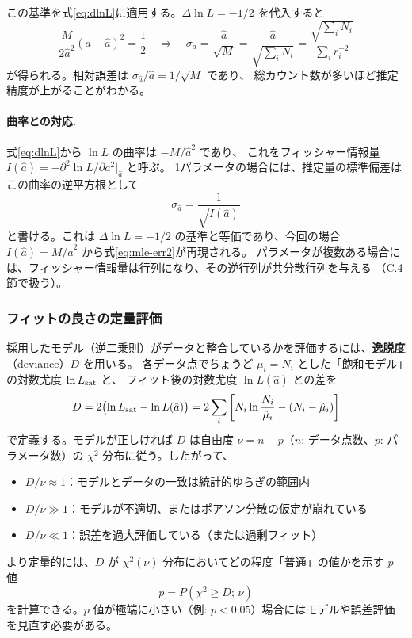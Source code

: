 \documentclass[uplatex,dvipdfmx,12pt,nomag]{jsarticle}
\begin{document}
この基準を式\eqref{eq:dlnL}に適用する。$\Delta\ln L = -1/2$ を代入すると
\begin{equation}
  \frac{M}{2\hat{a}^2}(a - \hat{a})^2 = \frac{1}{2}
  \quad\Longrightarrow\quad
  \sigma_{\hat{a}}
  = \frac{\hat{a}}{\sqrt{M}}
  = \frac{\hat{a}}{\sqrt{\sum_i N_i}}
  = \frac{\sqrt{\sum_i N_i}}{\sum_i r_i^{-2}}
  \label{eq:mle-err2}
\end{equation}
が得られる。相対誤差は $\sigma_{\hat{a}}/\hat{a} = 1/\sqrt{M}$ であり、
総カウント数が多いほど推定精度が上がることがわかる。

\paragraph{曲率との対応.}
式\eqref{eq:dlnL}から $\ln L$ の曲率は $-M/\hat{a}^2$ であり、
これをフィッシャー情報量 $I(\hat{a}) = -\partial^2\ln L/\partial a^2\big|_{\hat{a}}$ と呼ぶ。
1パラメータの場合には、推定量の標準偏差はこの曲率の逆平方根として
\begin{equation}
  \sigma_{\hat{a}} = \frac{1}{\sqrt{I(\hat{a})}}
  \label{eq:mle-err}
\end{equation}
と書ける。これは $\Delta\ln L = -1/2$ の基準と等価であり、今回の場合 $I(\hat{a}) = M/\hat{a}^2$
から式\eqref{eq:mle-err2}が再現される。
パラメータが複数ある場合には、フィッシャー情報量は行列になり、その逆行列が共分散行列を与える
（C.4節で扱う）。

\subsubsection*{フィットの良さの定量評価}

採用したモデル（逆二乗則）がデータと整合しているかを評価するには、\textbf{逸脱度}（deviance）$D$ を用いる。
各データ点でちょうど $\mu_i = N_i$ とした「飽和モデル」の対数尤度 $\ln L_{\rm sat}$ と、
フィット後の対数尤度 $\ln L(\hat{a})$ との差を
\begin{equation}
  D = 2\bigl(\ln L_{\rm sat} - \ln L(\hat{a})\bigr)
    = 2\sum_{i}\left[N_i \ln\frac{N_i}{\hat{\mu}_i} - (N_i - \hat{\mu}_i)\right]
  \label{eq:deviance}
\end{equation}
で定義する。モデルが正しければ $D$ は自由度 $\nu = n - p$（$n$: データ点数、$p$: パラメータ数）の
$\chi^2$ 分布に従う。したがって、
\begin{itemize}
  \item $D/\nu \approx 1$：モデルとデータの一致は統計的ゆらぎの範囲内
  \item $D/\nu \gg 1$：モデルが不適切、またはポアソン分散の仮定が崩れている
  \item $D/\nu \ll 1$：誤差を過大評価している（または過剰フィット）
\end{itemize}
より定量的には、$D$ が $\chi^2(\nu)$ 分布においてどの程度「普通」の値かを示す
$p$ 値
\begin{equation}
  p = P\!\left(\chi^2 \ge D;\,\nu\right)
\end{equation}
を計算できる。$p$ 値が極端に小さい（例: $p < 0.05$）場合にはモデルや誤差評価を見直す必要がある。
\end{document}

